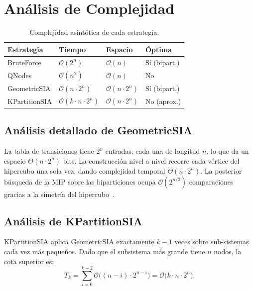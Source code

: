 \documentclass[11pt,letterpaper]{article}
\begin{document}
\section{Análisis de Complejidad}
\label{sec:complejidad}

\begin{table}[H]
  \centering
  \caption{Complejidad asintótica de cada estrategia.}
  \label{tab:complejidad}
  \begin{tabular}{l l l l}
    \toprule
    Estrategia & Tiempo & Espacio & Óptima \\
    \midrule
    BruteForce     & $\mathcal{O}(2^n)$         & $\mathcal{O}(n)$       & Sí (bipart.) \\
    QNodes         & $\mathcal{O}(n^2)$          & $\mathcal{O}(n)$       & No           \\
    GeometricSIA   & $\mathcal{O}(n \cdot 2^n)$ & $\mathcal{O}(n \cdot 2^n)$ & Sí (bipart.) \\
    KPartitionSIA  & $\mathcal{O}(k \cdot n \cdot 2^n)$ & $\mathcal{O}(n \cdot 2^n)$ & No (aprox.) \\
    \bottomrule
  \end{tabular}
\end{table}

\subsection{Análisis detallado de GeometricSIA}

La tabla de transiciones tiene $2^n$ entradas, cada una de longitud $n$,
lo que da un espacio $\Theta(n \cdot 2^n)$ bits.  La construcción nivel a
nivel recorre cada vértice del hipercubo una sola vez, dando complejidad
temporal $\Theta(n \cdot 2^n)$.  La posterior búsqueda de la MIP sobre las
biparticiones ocupa $\mathcal{O}(2^{n/2})$ comparaciones gracias a la
simetría del hipercubo~\cite{geomip2025}.

\subsection{Análisis de KPartitionSIA}

KPartitionSIA aplica GeometricSIA exactamente $k-1$ veces sobre sub-sistemas
cada vez más pequeños.  Dado que el subsistema más grande tiene $n$ nodos,
la cota superior es:
\[
  T_k = \sum_{i=0}^{k-2} \mathcal{O}\bigl((n-i) \cdot 2^{n-i}\bigr)
       = \mathcal{O}\bigl(k \cdot n \cdot 2^n\bigr).
\]
\end{document}
